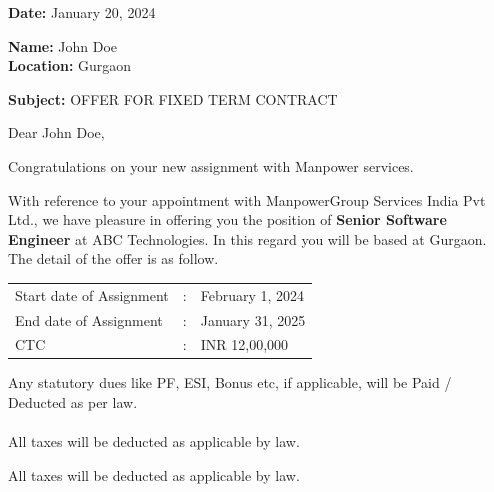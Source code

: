 \documentclass[a4paper,8pt]{article}
\begin{document}
\vspace{0.1cm}
\noindent\hrulefill
\vspace{0.2cm}

\textbf{Date:} January 20, 2024

\vspace{0.3cm}

\textbf{Name:} John Doe\\
\textbf{Location:} Gurgaon

\vspace{0.3cm}

\textbf{Subject:} OFFER FOR FIXED TERM CONTRACT

\vspace{0.5cm}

Dear John Doe,

\vspace{0.3cm}

Congratulations on your new assignment with Manpower services.

\vspace{0.3cm}

With reference to your appointment with ManpowerGroup Services India Pvt Ltd., we have pleasure in offering you the position of \textbf{Senior Software Engineer} at ABC Technologies. In this regard you will be based at Gurgaon. The detail of the offer is as follow.

\vspace{0.5cm}

\begin{tabular}{lll}
Start date of Assignment & : & February 1, 2024 \\
End date of Assignment & : & January 31, 2025 \\
CTC & : & INR 12,00,000 \\
\end{tabular}

\vspace{0.5cm}

Any statutory dues like PF, ESI, Bonus etc, if applicable, will be Paid / Deducted as per law.\\\\All taxes will be deducted as applicable by law.

\vspace{0.3cm}

All taxes will be deducted as applicable by law.

\vspace{0.5cm}
\end{document}
